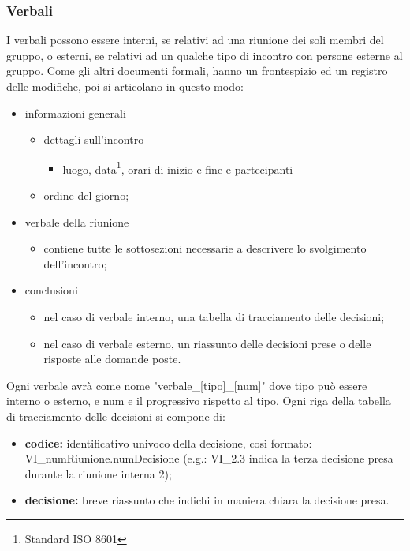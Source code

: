     \subsubsection{Verbali}
    \label{verbali}
    I verbali possono essere interni, se relativi ad una riunione dei soli membri del gruppo, o esterni, se relativi ad un qualche tipo di incontro con persone esterne al gruppo. Come gli altri documenti formali, hanno un frontespizio ed un registro delle modifiche, poi si articolano in questo modo:
    \begin{itemize}
        \item informazioni generali
        \begin{itemize}
            \item dettagli sull'incontro
            \begin{itemize}
            \item luogo, data\footnote{Standard ISO 8601}, orari di inizio e fine e partecipanti
            \end{itemize}
            \item ordine del giorno;
        \end{itemize}
        \item verbale della riunione
        \begin{itemize}
            \item contiene tutte le sottosezioni necessarie a descrivere lo svolgimento dell'incontro;
        \end{itemize}

        \item conclusioni
        \begin{itemize}
            \item nel caso di verbale interno, una tabella di tracciamento delle decisioni;
            \item nel caso di verbale esterno, un riassunto delle decisioni prese o delle risposte alle domande poste.
        \end{itemize}

    \end{itemize}
    Ogni verbale avrà come nome "verbale\_[tipo]\_[num]" dove tipo può essere interno o esterno, e num e il progressivo rispetto al tipo.
    Ogni riga della tabella di tracciamento delle decisioni si compone di:
    \begin{itemize}
        \item \textbf{codice: }identificativo univoco della decisione, così formato: VI\_numRiunione.numDecisione (e.g.: VI\_2.3 indica la terza decisione presa durante la riunione interna 2);
        \item \textbf{decisione: }breve riassunto che indichi in maniera chiara la decisione presa.
    \end{itemize}

